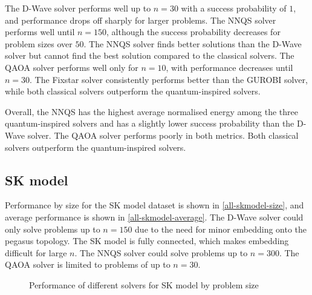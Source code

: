 The D-Wave solver performs well up to $n=30$ with a success probability of $1$, and performance drops off sharply for larger problems. The NNQS solver performs well until $n=150$, although the success probability decreases for problem sizes over $50$. The NNQS solver finds better solutions than the D-Wave solver but cannot find the best solution compared to the classical solvers. The QAOA solver performs well only for $n=10$, with performance decreases until $n=30$. The Fixstar solver consistently performs better than the GUROBI solver, while both classical solvers outperform the quantum-inspired solvers.

Overall, the NNQS has the highest average normalised energy among the three quantum-inspired solvers and has a slightly lower success probability than the D-Wave solver. The QAOA solver performs poorly in both metrics. Both classical solvers outperform the quantum-inspired solvers.

\subsection{SK model}
Performance by size for the SK model dataset is shown in \autoref{all-skmodel-size}, and average performance is shown in \autoref{all-skmodel-average}. The D-Wave solver could only solve problems up to $n=150$ due to the need for minor embedding onto the pegasus topology. The SK model is fully connected, which makes embedding difficult for large $n$. The NNQS solver could solve problems up to $n=300$. The QAOA solver is limited to problems of up to $n=30$.

\begin{figure}[!htb]
    \centering
    \caption{Performance of different solvers for SK model by problem size}
    \label{all-skmodel-size}
\end{figure}


